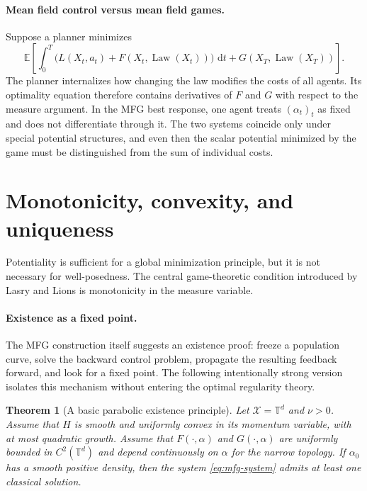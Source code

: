 \documentclass[11pt,a4paper]{article}
\newtheorem{theorem}{Theorem}[section]
\theoremstyle{definition}
\newcommand{\Law}{\operatorname{Law}}
\newcommand{\dd}{\,\mathrm d}
\newcommand{\al}{\alpha}
\begin{document}
\paragraph{Mean field control versus mean field games.}
Suppose a planner minimizes
\begin{equation}\label{eq:mean-field-control-cost}
  \mathbb E\!\left[
    \int_0^T \bigl(L(X_t,a_t)+F(X_t,\Law(X_t))\bigr)\,\dd t
    +G(X_T,\Law(X_T))
  \right].
\end{equation}
The planner internalizes how changing the law modifies the costs of all
agents.  Its optimality equation therefore contains derivatives of $F$ and
$G$ with respect to the measure argument.  In the MFG best response, one
agent treats $(\al_t)_t$ as fixed and does not differentiate through it.  The
two systems coincide only under special potential structures, and even then
the scalar potential minimized by the game must be distinguished from the
sum of individual costs.

\section{Monotonicity, convexity, and uniqueness}

Potentiality is sufficient for a global minimization principle, but it is not
necessary for well-posedness.  The central game-theoretic condition introduced
by Lasry and Lions is monotonicity in the measure variable.

\paragraph{Existence as a fixed point.}
The MFG construction itself suggests an existence proof: freeze a population
curve, solve the backward control problem, propagate the resulting feedback
forward, and look for a fixed point.  The following intentionally strong
version isolates this mechanism without entering the optimal regularity
theory.

\begin{theorem}[A basic parabolic existence principle]
\label{thm:mfg-basic-existence}
Let $\mathcal X=\mathbb T^d$ and $\nu>0$.  Assume that $H$ is smooth and
uniformly convex in its momentum variable, with at most quadratic growth.
Assume that $F(\cdot,\al)$ and $G(\cdot,\al)$ are uniformly bounded in
$C^2(\mathbb T^d)$ and depend continuously on $\al$ for the narrow topology.
If $\al_0$ has a smooth positive density, then the system
\eqref{eq:mfg-system} admits at least one classical solution.
\end{theorem}
\end{document}
